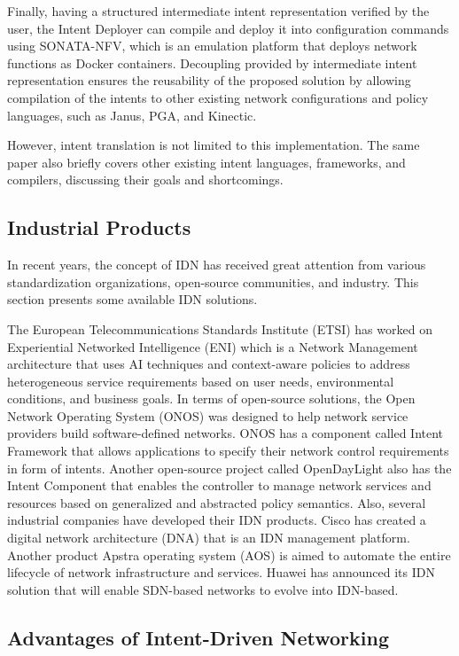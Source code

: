 Finally, having a structured intermediate intent representation verified by the user, the Intent Deployer can compile and deploy it into configuration commands using SONATA-NFV, which is an emulation platform that deploys network functions as Docker containers. Decoupling provided by intermediate intent representation ensures the reusability of the proposed solution by allowing compilation of the intents to other existing network configurations and policy languages, such as Janus, PGA, and Kinectic.

However, intent translation is not limited to this implementation. The same paper \cite[20]{Jacobs2018} also briefly covers other existing intent languages, frameworks, and compilers, discussing their goals and shortcomings.
	

\subsection{Industrial Products}

In recent years, the concept of IDN has received great attention from various standardization organizations, open-source communities, and industry. This section presents some available IDN solutions.

The European Telecommunications Standards Institute (ETSI) has worked on Experiential Networked Intelligence (ENI) which is a Network Management architecture that uses AI techniques and context-aware policies to address heterogeneous service requirements based on user needs, environmental conditions, and business goals. In terms of open-source solutions, the Open Network Operating System (ONOS) was designed to help network service providers build software-defined networks. ONOS has a component called Intent Framework that allows applications to specify their network control requirements in form of intents. Another open-source project called OpenDayLight also has the Intent Component that enables the controller to manage network services and resources based on generalized and abstracted policy semantics. Also, several industrial companies have developed their IDN products. Cisco has created a digital network architecture (DNA) that is an IDN management platform. Another product Apstra operating system (AOS) is aimed to automate the entire lifecycle of network infrastructure and services. Huawei has announced its IDN solution that will enable SDN-based networks to evolve into IDN-based. \cite{8968429}


\subsection{Advantages of Intent-Driven Networking}

